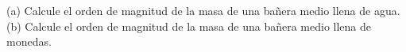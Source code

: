 \item (a) Calcule el orden de magnitud de la masa de una bañera medio llena de agua. (b) Calcule el orden de magnitud de la masa de una bañera medio llena de monedas.
